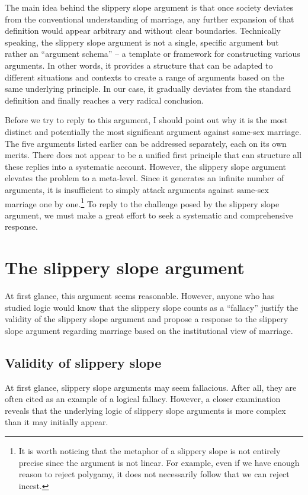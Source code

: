 \documentclass[man,floatsintext]{apa7}
\begin{document}
The main idea behind the slippery slope argument is that once society deviates from the conventional understanding of marriage, any further expansion of that definition would appear arbitrary and without clear boundaries. Technically speaking, the slippery slope argument is not a single, specific argument but rather an ``argument schema'' -- a template or framework for constructing various arguments. In other words, it provides a structure that can be adapted to different situations and contexts to create a range of arguments based on the same underlying principle. In our case, it gradually deviates from the standard definition and finally reaches a very radical conclusion.

Before we try to reply to this argument, I should point out why it is the most distinct and potentially the most significant argument against same-sex marriage. The five arguments listed earlier can be addressed separately, each on its own merits. There does not appear to be a unified first principle that can structure all these replies into a systematic account. However, the slippery slope argument elevates the problem to a meta-level. Since it generates an infinite number of arguments, it is insufficient to simply attack arguments against same-sex marriage one by one.\footnote{It is worth noticing that the metaphor of a slippery slope is not entirely precise since the argument is not linear. For example, even if we have enough reason to reject polygamy, it does not necessarily follow that we can reject incest.} To reply to the challenge posed by the slippery slope argument, we must make a great effort to seek a systematic and comprehensive response.

\section{The slippery slope argument}

At first glance, this argument seems reasonable. However, anyone who has studied logic would know that the slippery slope counts as a ``fallacy'' justify the validity of the slippery slope argument and propose a response to the slippery slope argument regarding marriage based on the institutional view of marriage.

\subsection{Validity of slippery slope}

At first glance, slippery slope arguments may seem fallacious. After all, they are often cited as an example of a logical fallacy. However, a closer examination reveals that the underlying logic of slippery slope arguments is more complex than it may initially appear.
\end{document}
